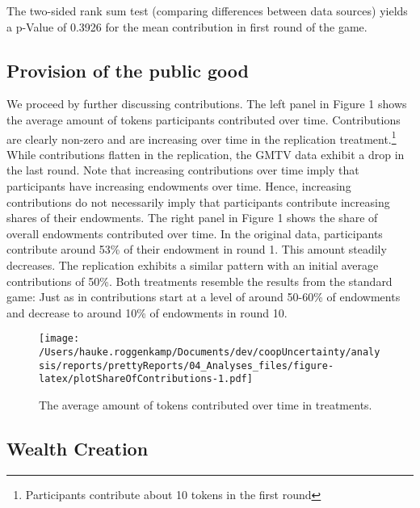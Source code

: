 \documentclass[11pt,]{article}
\begin{document}
The two-sided rank sum test (comparing differences between data sources)
yields a p-Value of 0.3926 for the mean contribution in first round of
the game.

\hypertarget{provision-of-the-public-good}{%
\subsection{Provision of the public
good}\label{provision-of-the-public-good}}

We proceed by further discussing contributions. The left panel in Figure
1 shows the average amount of tokens participants contributed over time.
Contributions are clearly non-zero and are increasing over time in the
replication treatment.\footnote{Participants contribute about 10 tokens
  in the first round} While contributions flatten in the replication,
the GMTV data exhibit a drop in the last round. Note that increasing
contributions over time imply that participants have increasing
endowments over time. Hence, increasing contributions do not necessarily
imply that participants contribute increasing shares of their
endowments. The right panel in Figure 1 shows the share of overall
endowments contributed over time. In the original data, participants
contribute around 53\% of their endowment in round 1. This amount
steadily decreases. The replication exhibits a similar pattern with an
initial average contributions of 50\%. Both treatments resemble the
results from the standard game: Just as in \citet{fehrgaechter2000}
contributions start at a level of around 50-60\% of endowments and
decrease to around 10\% of endowments in round 10.

\begin{figure}
\centering
\texttt{[image: /Users/hauke.roggenkamp/Documents/dev/coopUncertainty/analysis/reports/prettyReports/04\_Analyses\_files/figure-latex/plotShareOfContributions-1.pdf]}
\caption{The average amount of tokens contributed over time in
treatments.}
\end{figure}

\hypertarget{wealth-creation}{%
\subsection{Wealth Creation}\label{wealth-creation}}
\end{document}
